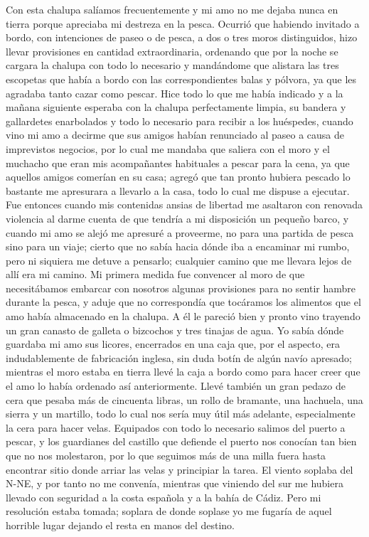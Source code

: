 \documentclass{novela}
\begin{document}
    Con esta chalupa salíamos frecuentemente y mi amo no me dejaba nunca en tierra porque apreciaba mi destreza en la pesca. Ocurrió que habiendo invitado a bordo, con intenciones de paseo o de pesca, a dos o tres moros distinguidos, hizo llevar provisiones en cantidad extraordinaria, ordenando que por la noche se cargara la chalupa con todo lo necesario y mandándome que alistara las tres escopetas que había a bordo con las correspondientes balas y pólvora, ya que les agradaba tanto cazar como pescar.
    Hice todo lo que me había indicado y a la mañana siguiente esperaba con la chalupa perfectamente limpia, su bandera y gallardetes enarbolados y todo lo necesario para recibir a los huéspedes, cuando vino mi amo a decirme que sus amigos habían renunciado al paseo a causa de imprevistos negocios, por lo cual me mandaba que saliera con el moro y el muchacho que eran mis acompañantes habituales a pescar para la cena, ya que aquellos amigos comerían en su casa; agregó que tan pronto hubiera pescado lo bastante me apresurara a llevarlo a la casa, todo lo cual me dispuse a ejecutar.
    Fue entonces cuando mis contenidas ansias de libertad me asaltaron con renovada violencia al darme cuenta de que tendría a mi disposición un pequeño barco, y cuando mi amo se alejó me apresuré a proveerme, no para una partida de pesca sino para un viaje; cierto que no sabía hacia dónde iba a encaminar mi rumbo, pero ni siquiera me detuve a pensarlo; cualquier camino que me llevara lejos de allí era mi camino.
    Mi primera medida fue convencer al moro de que necesitábamos embarcar con nosotros algunas provisiones para no sentir hambre durante la pesca, y aduje que no correspondía que tocáramos los alimentos que el amo había almacenado en la chalupa. A él le pareció bien y pronto vino trayendo un gran canasto de galleta o bizcochos y tres tinajas de agua. Yo sabía dónde guardaba mi amo sus licores, encerrados en una caja que, por el aspecto, era indudablemente de fabricación inglesa, sin duda botín de algún navío apresado; mientras el moro estaba en tierra llevé la caja a bordo como para hacer creer que el amo lo había ordenado así anteriormente. Llevé también un gran pedazo de cera que pesaba más de cincuenta libras, un rollo de bramante, una hachuela, una sierra y un martillo, todo lo cual nos sería muy útil más adelante, especialmente la cera para hacer velas. Equipados con todo lo necesario salimos del puerto a pescar, y los guardianes del castillo que defiende el puerto nos conocían tan bien que no nos molestaron, por lo que seguimos más de una milla fuera hasta encontrar sitio donde arriar las velas y principiar la tarea. El viento soplaba del N-NE, y por tanto no me convenía, mientras que viniendo del sur me hubiera llevado con seguridad a la costa española y a la bahía de Cádiz. Pero mi resolución estaba tomada; soplara de donde soplase yo me fugaría de aquel horrible lugar dejando el resta en manos del destino.
\end{document}
